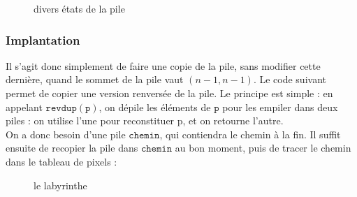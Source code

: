 \documentclass[11pt,a4paper]{article}
\begin{document}
\begin{figure}[h]
	\begin{center}

\hspace{2cm}
	\caption{divers états de la pile}
	\end{center}
\end{figure}

\subsubsection{Implantation}

Il s'agit donc simplement de faire une copie de la pile, sans modifier cette dernière, quand le sommet de la pile vaut $(n-1,n-1)$. Le code suivant permet de copier une version renversée de la pile. Le principe est simple : en appelant $\mathtt{revdup(p)}$, on dépile les éléments de $\mathtt{p}$ pour les empiler dans deux piles : on utilise l'une pour reconstituer p, et on retourne l'autre.\\

%

On a donc besoin d'une pile $\mathtt{chemin}$, qui contiendra le chemin à la fin. Il suffit ensuite de recopier la pile dans $\mathtt{chemin}$ au bon moment, puis de tracer le chemin dans le tableau de pixels :

%
%

\begin{figure}[p]
\begin{center}
\caption{le labyrinthe}
\end{center}
\end{figure}
\end{document}
